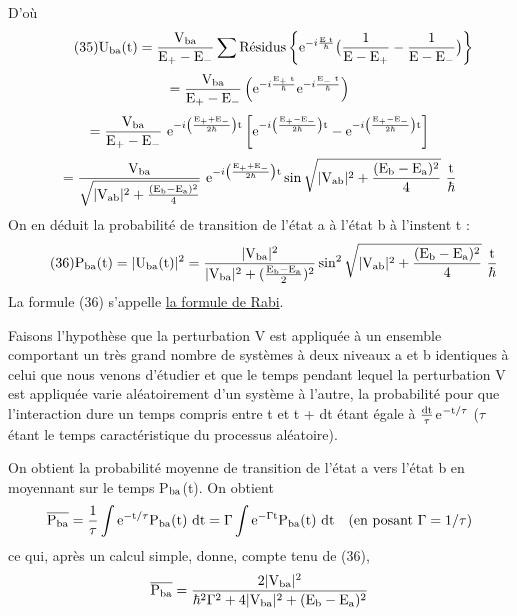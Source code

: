 D'où
\[
\tag{35}\text{U}_{\text{ba}}\text{(t)}=\frac{\text{V}_{\text{ba}}}{\text{E}_+-\text{E}_-}\sum\text{Résidus}\left\{
\text{e}^{-i\frac{\text{E t}}{\hbar}}\big(\frac{1}{\text{E}-\text{E}_+}-\frac{1}{\text{E}-\text{E}_-}\big)\right\}
\]
\[
=\frac{\text{V}_{\text{ba}}}{\text{E}_+-\text{E}_-}
\left(\text{e}^{-i\frac{\text{E}_+\text{ t}}{\hbar}}\text{e}^{-i\frac{\text{E}_-\text{ t}}{\hbar}}\right)
\]
\[
=\frac{\text{V}_{\text{ba}}}{\text{E}_+-\text{E}_-}\text{ e}^{-i\left(\frac{\text{E}_++\text{E}_-}{2\hbar}\right)\text{t}}\left[
\text{e}^{-i\left(\frac{\text{E}_+-\text{E}_-}{2\hbar}\right)\text{t}}-
\text{e}^{-i\left(\frac{\text{E}_+-\text{E}_-}{2\hbar}\right)\text{t}}\right]
\]
\[
=\frac{\mt{V}_\mt{ba}}{\sqrt{|\mt{V}_\mt{ab}|^2+\frac{(\mt{E}_\mt{b}-\mt{E}_\mt{a})^2}{4}}}
\mt{ e}^{-i\left(\frac{\mt{E}_++\mt{E}_-}{2\hbar}\right)\mt{t}}
\sin\sqrt{|\mt{V}_\mt{ab}|^2+\frac{(\mt{E}_\mt{b}-\mt{E}_\mt{a})^2}{4}}\ \frac{\mt{t}}{\hbar}
\]
On en déduit la probabilité de transition de l'état a à l'état b à l'instent t :
\[
\tag{36}\mt{P}_\mt{ba}\mt{(t)}=|\mt{U}_\mt{ba}\mt{(t)}|^2=
\frac{|\mt{V}_\mt{ba}|^2}{|\mt{V}_\mt{ba}|^2+(\frac{\mt{E}_\mt{b}-\mt{E}_\mt{a}}{2})^2}
\sin^2\sqrt{|\mt{V}_\mt{ab}|^2+\frac{(\mt{E}_\mt{b}-\mt{E}_\mt{a})^2}{4}}\ \frac{\mt{t}}{\hbar}
\]
La formule (36) s'appelle \ul{la formule de Rabi}.

Faisons l'hypothèse que la perturbation V est appliquée à un ensemble comportant un très
grand nombre de systèmes à deux niveaux a et b identiques
à celui que nous venons d'étudier et que le temps pendant lequel la perturbation
V est appliquée varie aléatoirement d'un système à l'autre, la probabilité pour
que l'interaction dure un temps compris entre t et t + dt étant égale à $\frac{\text{dt}}{\tau}$e$^{-\text{t}/\tau}$
($\tau$ étant le temps caractéristique du processus aléatoire).

On obtient la probabilité moyenne de transition de l'état a vers l'état
b en moyennant sur le temps P$_{\text{ba}}$(t). On obtient
\[
\overline{\text{P}_{\text{ba}}}=\frac{1}{\tau}\int\text{e}^{-\text{t}/\tau}\text{P}_{\text{ba}}\text{(t) dt}
=\Gamma\int\text{e}^{-\Gamma\text{t}}\text{P}_{\text{ba}}\text{(t) dt}\quad\text{(en posant }\Gamma=1/\tau)
\]
ce qui, après un calcul simple, donne, compte tenu de (36),
\[
\overline{\text{P}_{\text{ba}}}=\frac{2|\text{V}_{\text{ba}}|^2}
{\hbar^2\Gamma^2+4|\text{V}_{\text{ba}}|^2+(\text{E}_{\text{b}}-\text{E}_{\text{a}})^2}
\]


